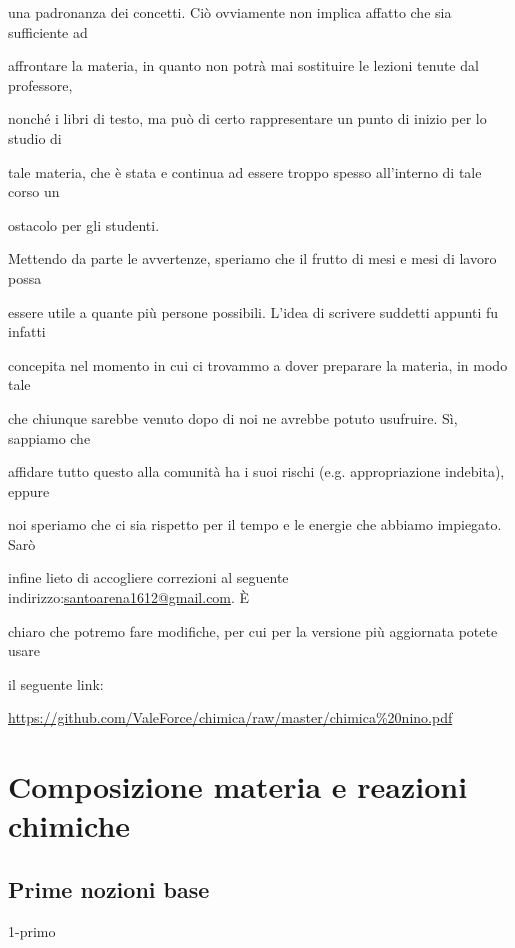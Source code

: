\documentclass[openany,12pt]{book}%
\newcommand{\E}{È \hspace{0.1mm}}
\newcommand\blankpage{%
    \null
    \thispagestyle{empty}%
    \newpage}
\begin{document}
una padronanza dei concetti. Ciò ovviamente non implica affatto che sia sufficiente ad

affrontare la materia, in quanto non potrà mai sostituire le lezioni tenute dal professore,

nonché i libri di testo, ma può di certo rappresentare un punto di inizio per lo studio di

tale materia, che è stata e continua ad essere troppo spesso all'interno di tale corso un

ostacolo per gli studenti.

\vspace{0.2cm}
Mettendo da parte le avvertenze, speriamo che il frutto di mesi e mesi di lavoro possa

essere utile a quante più persone possibili. L'idea di scrivere suddetti appunti fu infatti

concepita nel momento in cui ci trovammo a dover preparare la materia, in modo tale

che chiunque sarebbe venuto dopo di noi ne avrebbe potuto usufruire. Sì, sappiamo che

affidare tutto questo alla comunità ha i suoi rischi (e.g. appropriazione indebita), eppure

noi speriamo che ci sia rispetto per il tempo e le energie che abbiamo impiegato. Sarò

infine lieto di accogliere correzioni al seguente indirizzo:\hspace{0.15cm}\href{mailto:santoarena1612@gmail.com}{santoarena1612@gmail.com}. \E

chiaro che potremo fare modifiche, per cui per la versione più aggiornata potete usare

il seguente link:

\begin{center}
\url{https://github.com/ValeForce/chimica/raw/master/chimica%20nino.pdf}
\end{center}

\afterpage{\blankpage}
\newpage

\mainmatter

\chapter{Composizione materia e reazioni chimiche}

  \section{Prime nozioni base}
    {1-primo}
\end{document}
